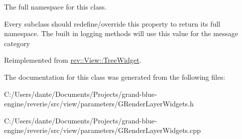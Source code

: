 The full namespace for this class. 

Every subclass should redefine/override this property to return its full namespace. The built in logging methods will use this value for the message category 

Reimplemented from \mbox{\hyperlink{classrev_1_1_view_1_1_tree_widget_a09be824e34e50e9622c3dc333c9a3c07}{rev\+::\+View\+::\+Tree\+Widget}}.



The documentation for this class was generated from the following files\+:\begin{DoxyCompactItemize}
\item 
C\+:/\+Users/dante/\+Documents/\+Projects/grand-\/blue-\/engine/reverie/src/view/parameters/G\+Render\+Layer\+Widgets.\+h\item 
C\+:/\+Users/dante/\+Documents/\+Projects/grand-\/blue-\/engine/reverie/src/view/parameters/G\+Render\+Layer\+Widgets.\+cpp\end{DoxyCompactItemize}
